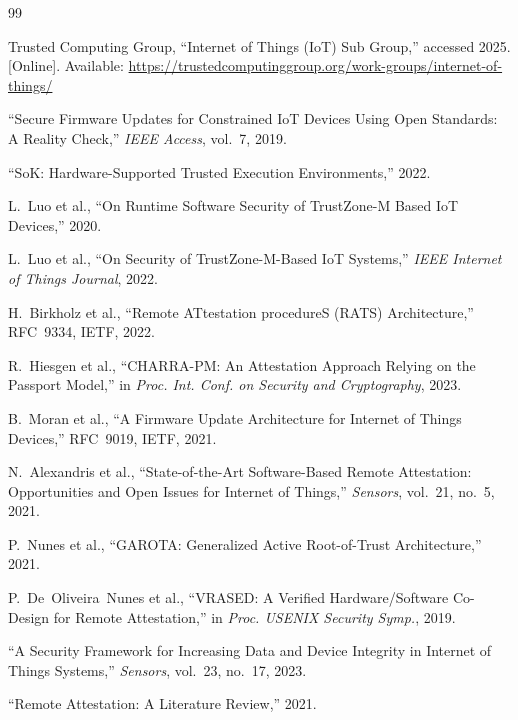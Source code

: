 \documentclass[conference,11pt,a4paper]{IEEEtran}
\begin{document}
\begin{thebibliography}{99}

Trusted Computing Group, ``Internet of Things (IoT) Sub Group,'' accessed 2025. [Online]. Available: \url{https://trustedcomputinggroup.org/work-groups/internet-of-things/}

``Secure Firmware Updates for Constrained IoT Devices Using Open Standards: A Reality Check,'' \emph{IEEE Access}, vol.~7, 2019.

``SoK: Hardware-Supported Trusted Execution Environments,'' 2022.

L.~Luo et al., ``On Runtime Software Security of TrustZone-M Based IoT Devices,'' 2020.

L.~Luo et al., ``On Security of TrustZone-M-Based IoT Systems,'' \emph{IEEE Internet of Things Journal}, 2022.

H.~Birkholz et al., ``Remote ATtestation procedureS (RATS) Architecture,'' RFC~9334, IETF, 2022.

R.~Hiesgen et al., ``CHARRA-PM: An Attestation Approach Relying on the Passport Model,'' in \emph{Proc. Int. Conf. on Security and Cryptography}, 2023.

B.~Moran et al., ``A Firmware Update Architecture for Internet of Things Devices,'' RFC~9019, IETF, 2021.

N.~Alexandris et al., ``State-of-the-Art Software-Based Remote Attestation: Opportunities and Open Issues for Internet of Things,'' \emph{Sensors}, vol.~21, no.~5, 2021.

P.~Nunes et al., ``GAROTA: Generalized Active Root-of-Trust Architecture,'' 2021.

P.~De~Oliveira~Nunes et al., ``VRASED: A Verified Hardware/Software Co-Design for Remote Attestation,'' in \emph{Proc. USENIX Security Symp.}, 2019.

``A Security Framework for Increasing Data and Device Integrity in Internet of Things Systems,'' \emph{Sensors}, vol.~23, no.~17, 2023.

``Remote Attestation: A Literature Review,'' 2021.

\end{thebibliography}
\end{document}
